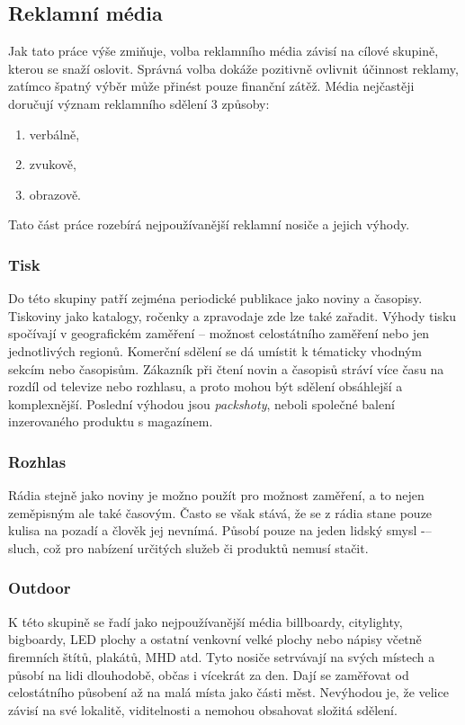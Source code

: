     \subsection{Reklamní média}
    Jak tato práce výše zmiňuje, volba reklamního média závisí na cílové skupině, kterou se snaží oslovit.
    Správná volba dokáže pozitivně ovlivnit účinnost reklamy, zatímco špatný výběr může přinést pouze finanční zátěž.
    Média nejčastěji doručují význam reklamního sdělení 3 způsoby:
    \begin{enumerate}
        \item verbálně,
        \item zvukově,
        \item obrazově.
    \end{enumerate}
    Tato část práce rozebírá nejpoužívanější reklamní nosiče a jejich výhody.
    
    \subsubsection{Tisk}
    Do této skupiny patří zejména periodické publikace jako noviny a časopisy. Tiskoviny jako katalogy, ročenky a zpravodaje zde lze také zařadit.
    Výhody tisku spočívají v geografickém zaměření -- možnost celostátního zaměření nebo jen jednotlivých regionů. Komerční sdělení se dá umístit k tématicky
    vhodným sekcím nebo časopisům. Zákazník při čtení novin a časopisů stráví více času na rozdíl od televize nebo rozhlasu,
    a proto mohou být sdělení obsáhlejší a komplexnější. Poslední výhodou jsou \emph{packshoty}, neboli společné balení inzerovaného produktu s magazínem.
    
    \subsubsection{Rozhlas}
    Rádia stejně jako noviny je možno použít pro možnost zaměření, a to nejen zeměpisným ale také časovým. Často se však stává,
    že se z rádia stane pouze kulisa na pozadí a člověk jej nevnímá. Působí pouze na jeden lidský smysl -– sluch,
    což pro nabízení určitých služeb či produktů nemusí stačit.

    \subsubsection{Outdoor}
    K této skupině se řadí jako nejpoužívanější média billboardy, citylighty, bigboardy, LED plochy a ostatní venkovní velké plochy nebo nápisy včetně
    firemních štítů, plakátů, MHD atd. Tyto nosiče setrvávají na svých místech a působí na lidi dlouhodobě, občas i vícekrát za den.
    Dají se zaměřovat od celostátního působení až na malá místa jako části měst. Nevýhodou je, že velice závisí na své lokalitě, viditelnosti a
    nemohou obsahovat složitá sdělení. 


